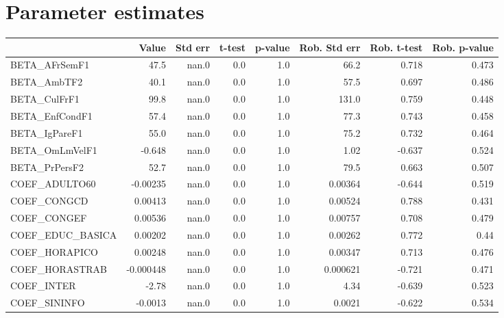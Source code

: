 \section{Parameter estimates}
\begin{tabular}{lrrrrrrr}
\toprule
{} &     Value &  Std err &  t-test &  p-value &  Rob. Std err &  Rob. t-test &  Rob. p-value \\
\midrule
BETA\_AFrSemF1      &      47.5 &    nan.0 &     0.0 &      1.0 &          66.2 &        0.718 &         0.473 \\
BETA\_AmbTF2        &      40.1 &    nan.0 &     0.0 &      1.0 &          57.5 &        0.697 &         0.486 \\
BETA\_CulFrF1       &      99.8 &    nan.0 &     0.0 &      1.0 &         131.0 &        0.759 &         0.448 \\
BETA\_EnfCondF1     &      57.4 &    nan.0 &     0.0 &      1.0 &          77.3 &        0.743 &         0.458 \\
BETA\_IgPareF1      &      55.0 &    nan.0 &     0.0 &      1.0 &          75.2 &        0.732 &         0.464 \\
BETA\_OmLmVelF1     &    -0.648 &    nan.0 &     0.0 &      1.0 &          1.02 &       -0.637 &         0.524 \\
BETA\_PrPersF2      &      52.7 &    nan.0 &     0.0 &      1.0 &          79.5 &        0.663 &         0.507 \\
COEF\_ADULTO60      &  -0.00235 &    nan.0 &     0.0 &      1.0 &       0.00364 &       -0.644 &         0.519 \\
COEF\_CONGCD        &   0.00413 &    nan.0 &     0.0 &      1.0 &       0.00524 &        0.788 &         0.431 \\
COEF\_CONGEF        &   0.00536 &    nan.0 &     0.0 &      1.0 &       0.00757 &        0.708 &         0.479 \\
COEF\_EDUC\_BASICA   &   0.00202 &    nan.0 &     0.0 &      1.0 &       0.00262 &        0.772 &          0.44 \\
COEF\_HORAPICO      &   0.00248 &    nan.0 &     0.0 &      1.0 &       0.00347 &        0.713 &         0.476 \\
COEF\_HORASTRAB     & -0.000448 &    nan.0 &     0.0 &      1.0 &      0.000621 &       -0.721 &         0.471 \\
COEF\_INTER         &     -2.78 &    nan.0 &     0.0 &      1.0 &          4.34 &       -0.639 &         0.523 \\
COEF\_SININFO       &   -0.0013 &    nan.0 &     0.0 &      1.0 &        0.0021 &       -0.622 &         0.534 \\

\end{tabular}
